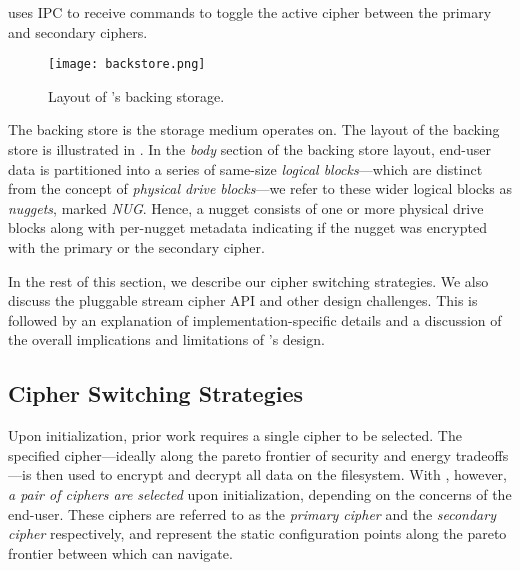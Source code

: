 \SYSTEM{} uses IPC to receive commands to toggle the active cipher between the
primary and secondary ciphers. 

\begin{figure}[t]
 \centering
  \texttt{[image: backstore.png]}
   \caption{Layout of \SYSTEM{}'s backing storage.}\label{fig:backstore2}
\end{figure}

The backing store is the storage medium \SYSTEM{} operates on. The layout of the
backing store is illustrated in . In the \textit{body} section
of the backing store layout, end-user data is partitioned into a series of
same-size \emph{logical blocks}---which are distinct from the concept of
\emph{physical drive blocks}---we refer to these wider logical blocks as
\emph{nuggets}, marked \textit{NUG}. Hence, a nugget consists of one or more
physical drive blocks along with per-nugget metadata indicating if the nugget
was encrypted with the primary or the secondary cipher. 

In the rest of this section, we describe our cipher switching strategies. We
also discuss the pluggable stream cipher API and other design challenges. This
is followed by an explanation of implementation-specific details and a
discussion of the overall implications and limitations of \SYSTEM{}'s design.

\subsection{Cipher Switching Strategies}

Upon initialization, prior work requires a single cipher to be selected. The
specified cipher---ideally along the pareto frontier of security and energy
tradeoffs---is then used to encrypt and decrypt all data on the filesystem. With
\SYSTEM{}, however, \emph{a pair of ciphers are selected} upon initialization,
depending on the concerns of the end-user. These ciphers are referred to as the
\emph{primary cipher} and the \emph{secondary cipher} respectively, and
represent the static configuration points along the pareto frontier between
which \SYSTEM{} can navigate. 

